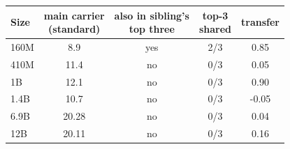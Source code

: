 \begin{tabular}{lcccc}
\toprule
Size & \makecell{main carrier\\(standard)} & \makecell{also in sibling's\\top three} & \makecell{top-3\\shared} & transfer \\
\midrule
160M & 8.9 & yes & 2/3 & 0.85 \\
410M & 11.4 & no & 0/3 & 0.05 \\
1B & 12.1 & no & 0/3 & 0.90 \\
1.4B & 10.7 & no & 0/3 & -0.05 \\
6.9B & 20.28 & no & 0/3 & 0.04 \\
12B & 20.11 & no & 0/3 & 0.16 \\
\bottomrule
\end{tabular}
